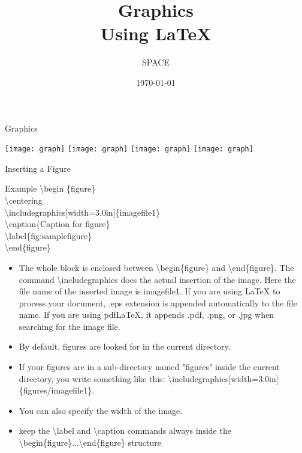 \documentclass{beamer}
\title{Graphics \\ Using \LaTeX}
\author{SPACE}
\date{\today}
\begin{document}
\maketitle
\begin{frame}{Graphics }
\begin{center}
\pause \texttt{[image: graph]}
\hspace{0.5cm} \pause \texttt{[image: graph]}
\hspace{0.5cm} \pause \texttt{[image: graph]}
\hspace{0.5cm} \pause \texttt{[image: graph]}
\end{center}
\end{frame}


\begin{frame}{Inserting a Figure}
\begin{block}{Example}
\textbackslash begin \{figure\}\\
\hspace{0.5cm}\textbackslash centering\\
\hspace{0.5cm}\textbackslash includegraphics[width=3.0in]\{imagefile1\}\\
\hspace{0.5cm}\textbackslash caption\{Caption for figure\}\\
\hspace{0.5cm}\textbackslash label\{fig:samplefigure\}\\
\textbackslash end\{figure\}
\end{block}
\begin{itemize}
\pause \item The whole block is enclosed between \textbackslash begin\{figure\} and \textbackslash end\{figure\}. The command \textbackslash includegraphics does the actual insertion of the image. Here the file name of the inserted image is imagefile1. If you are using LaTeX to process your document, .eps extension is appended automatically to the file name. If you are using pdfLaTeX, it appends .pdf, .png, or .jpg when searching for the image file.
\end{itemize}
\end{frame}

\begin{frame}
\begin{itemize}
\pause \item By default, figures are looked for in the current directory.
\pause \item If your figures are in a sub-directory named "figures" inside the current directory, you write something like this:   \textbackslash includegraphics[width=3.0in]\{figures/imagefile1\}.
\pause \item You can also specify the width of the image.
\pause \item keep the \textbackslash label and \textbackslash caption commands always inside the \textbackslash begin\{figure\}...\textbackslash end\{figure\} structure
\end{itemize}
\end{frame}
\end{document}
